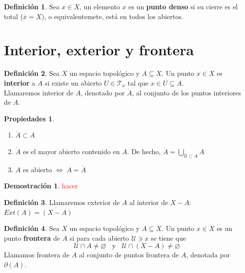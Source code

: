 \documentclass[12pt,twoside]{report}
\newcommand\mc[1]{\mathcal{#1}}
\theoremstyle{azul}
\theoremstyle{azul2}
\theoremstyle{plain}
\theoremstyle{definition}
\newtheorem*{defi}{Definición}
\newtheorem*{propi}{Propiedades}
\newtheorem*{dem}{Demostración}
\theoremstyle{remark}
\begin{document}
\begin{defi}
Sea $x \in X$, un elemento $x$ es un \textbf{punto denso} si su cierre es el total ($\overline{x}=X$), o equivalentemete, está en todos los abiertos. 
\end{defi}

\section{Interior, exterior y frontera}
\begin{defi}
Sea $X$ un espacio topológico y $A \subseteq X$. Un punto $x \in X$ es \textbf{interior} a $A$ si existe un abierto $U \in \mc{T}_x$ tal que $x \in U \subseteq A$.\\
Llamaremos interior de $A$, denotado por $\mathring{A}$, al conjunto de los puntos interiores de $A$.
\end{defi}

\begin{propi}\:
\begin{enumerate}
    \item $\mathring{A} \subset A$
    \item $\mathring{A}$ es el mayor abierto contenido en $A$. De hecho,  $\mathring{A} = \underset{\mc{U} \subset A}{\bigcup} A$
    \item $A$ es abierto $\Leftrightarrow \; A = \mathring{A}$
\end{enumerate}
\end{propi}
\begin{dem}
\textcolor{red}{hacer}
\end{dem}
\begin{defi}
Llamaremos exterior de $A$ al interior de $X - A$: $Ext(A) = \mathring{(X-A)}$
\end{defi}

\begin{defi}
Sea $X$ un espacio topológico y $A \subseteq X$. Un punto $x\in X$ es un punto \textbf{frontera} de $A$ si para cada abierto $\mc{U} \ni x$ se tiene que $$\mc{U} \cap A \neq \varnothing \;\;\text{  y  }\;\; \mc{U} \cap (X - A) \neq \varnothing$$
Llamamos frontera de $A$ al conjunto de puntos frontera de $A$, denotada por $\partial(A)$.
\end{defi}
\end{document}
